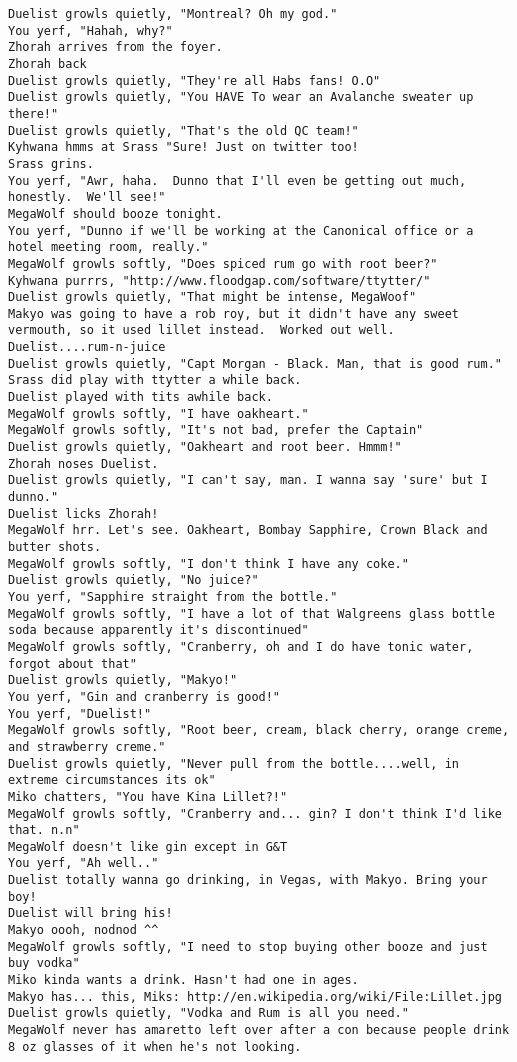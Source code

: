 \begin{verbatim}
Duelist growls quietly, "Montreal? Oh my god."
You yerf, "Hahah, why?"
Zhorah arrives from the foyer.
Zhorah back
Duelist growls quietly, "They're all Habs fans! O.O"
Duelist growls quietly, "You HAVE To wear an Avalanche sweater up there!"
Duelist growls quietly, "That's the old QC team!"
Kyhwana hmms at Srass "Sure! Just on twitter too!
Srass grins.
You yerf, "Awr, haha.  Dunno that I'll even be getting out much, honestly.  We'll see!"
MegaWolf should booze tonight.
You yerf, "Dunno if we'll be working at the Canonical office or a hotel meeting room, really."
MegaWolf growls softly, "Does spiced rum go with root beer?"
Kyhwana purrrs, "http://www.floodgap.com/software/ttytter/"
Duelist growls quietly, "That might be intense, MegaWoof"
Makyo was going to have a rob roy, but it didn't have any sweet vermouth, so it used lillet instead.  Worked out well.
Duelist....rum-n-juice
Duelist growls quietly, "Capt Morgan - Black. Man, that is good rum."
Srass did play with ttytter a while back.
Duelist played with tits awhile back.
MegaWolf growls softly, "I have oakheart."
MegaWolf growls softly, "It's not bad, prefer the Captain"
Duelist growls quietly, "Oakheart and root beer. Hmmm!"
Zhorah noses Duelist.
Duelist growls quietly, "I can't say, man. I wanna say 'sure' but I dunno."
Duelist licks Zhorah!
MegaWolf hrr. Let's see. Oakheart, Bombay Sapphire, Crown Black and butter shots.
MegaWolf growls softly, "I don't think I have any coke."
Duelist growls quietly, "No juice?"
You yerf, "Sapphire straight from the bottle."
MegaWolf growls softly, "I have a lot of that Walgreens glass bottle soda because apparently it's discontinued"
MegaWolf growls softly, "Cranberry, oh and I do have tonic water, forgot about that"
Duelist growls quietly, "Makyo!"
You yerf, "Gin and cranberry is good!"
You yerf, "Duelist!"
MegaWolf growls softly, "Root beer, cream, black cherry, orange creme, and strawberry creme."
Duelist growls quietly, "Never pull from the bottle....well, in extreme circumstances its ok"
Miko chatters, "You have Kina Lillet?!"
MegaWolf growls softly, "Cranberry and... gin? I don't think I'd like that. n.n"
MegaWolf doesn't like gin except in G&T
You yerf, "Ah well.."
Duelist totally wanna go drinking, in Vegas, with Makyo. Bring your boy!
Duelist will bring his!
Makyo oooh, nodnod ^^
MegaWolf growls softly, "I need to stop buying other booze and just buy vodka"
Miko kinda wants a drink. Hasn't had one in ages.
Makyo has... this, Miks: http://en.wikipedia.org/wiki/File:Lillet.jpg
Duelist growls quietly, "Vodka and Rum is all you need."
MegaWolf never has amaretto left over after a con because people drink 8 oz glasses of it when he's not looking.

\end{verbatim}
